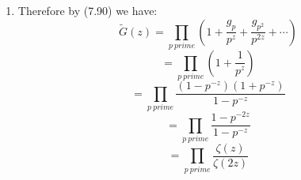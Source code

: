 \documentclass[12pt,a4paper]{article}
\makeatletter
\newtheorem*{solution}{Solution}
\theoremstyle{definition}
\renewenvironment{solution}[1][Solution] {\par\pushQED{\qed}\normalfont\topsep6\p@\@plus6\p@\relax\trivlist\item[\hskip\labelsep\bfseries#1\@addpunct{.}]\ignorespaces}{\popQED\endtrivlist\@endpefalse} \makeatother
\makeatother
\begin{document}
\begin{enumerate}
\begin{solution}
\begin{enumerate}
        		    Therefore by (7.90) we have:
        		    \begin{equation*}
        		        \widetilde{G}(z)=\prod_{p\ prime}(1+\frac{g_p}{p^z}+\frac{g_{p^2}}{p^{2z}}+\cdots)
        		    \end{equation*}
        		    \begin{equation*}
        		        =\prod_{p\ prime}(1+\frac{1}{p^z})
        		    \end{equation*}
        		    \begin{equation*}
        		        =\prod_{p\ prime}\frac{(1-p^{-z})(1+p^{-z})}{1-p^{-z}}
        		    \end{equation*}
        		    \begin{equation*}
        		        =\prod_{p\ prime}\frac{1-p^{-2z}}{1-p^{-z}}
        		    \end{equation*}
                    \begin{equation*}
                        =\prod_{p\ prime}\frac{\zeta(z)}{\zeta(2z)}
                    \end{equation*}
        	\end{enumerate}
        \end{solution}
\end{enumerate}

\end{document}
